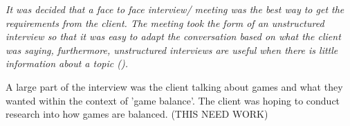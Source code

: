 \textit{It was decided that a face to face interview/ meeting was the best way to get the requirements from the client. The meeting took the form of an unstructured interview so that it was easy to adapt the conversation based on what the client was saying, furthermore, unstructured interviews are useful when there is little information about a topic (\cite{easwaramoorthy2006interviewing}). }

A large part of the interview was the client talking about games and what they wanted within the context of 'game balance'.  The client was hoping to conduct research into how games are balanced. (THIS NEED WORK)